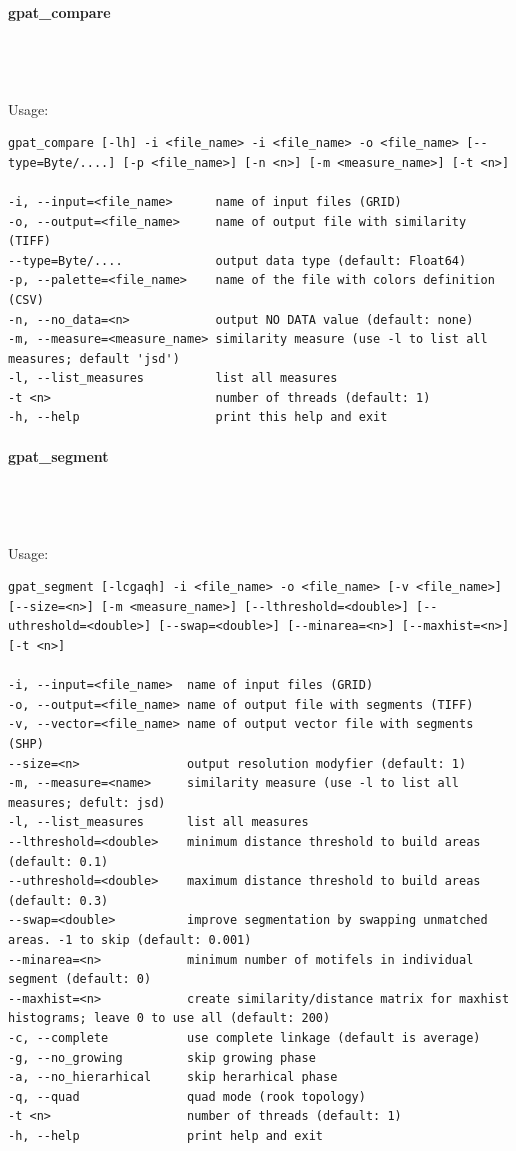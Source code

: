 \documentclass[12pt,margin=0.5in]{article}
\newcommand{\newparagraph}[1]{\paragraph{#1}\mbox{}\\}
\begin{document}
\newparagraph{gpat\_compare}
{}
\\\\
Usage:

\begin{minipage}{\linewidth}
\begin{lstlisting}
gpat_compare [-lh] -i <file_name> -i <file_name> -o <file_name> [--type=Byte/....] [-p <file_name>] [-n <n>] [-m <measure_name>] [-t <n>]

-i, --input=<file_name>      name of input files (GRID)
-o, --output=<file_name>     name of output file with similarity (TIFF)
--type=Byte/....             output data type (default: Float64)
-p, --palette=<file_name>    name of the file with colors definition (CSV)
-n, --no_data=<n>            output NO DATA value (default: none)
-m, --measure=<measure_name> similarity measure (use -l to list all measures; default 'jsd')
-l, --list_measures          list all measures
-t <n>                       number of threads (default: 1)
-h, --help                   print this help and exit
\end{lstlisting}
\end{minipage}

\newparagraph{gpat\_segment}
{}
\\\\
Usage:

\begin{minipage}{\linewidth}
\begin{lstlisting}
gpat_segment [-lcgaqh] -i <file_name> -o <file_name> [-v <file_name>] [--size=<n>] [-m <measure_name>] [--lthreshold=<double>] [--uthreshold=<double>] [--swap=<double>] [--minarea=<n>] [--maxhist=<n>] [-t <n>]

-i, --input=<file_name>  name of input files (GRID)
-o, --output=<file_name> name of output file with segments (TIFF)
-v, --vector=<file_name> name of output vector file with segments (SHP)
--size=<n>               output resolution modyfier (default: 1)
-m, --measure=<name>     similarity measure (use -l to list all measures; defult: jsd)
-l, --list_measures      list all measures
--lthreshold=<double>    minimum distance threshold to build areas (default: 0.1)
--uthreshold=<double>    maximum distance threshold to build areas (default: 0.3)
--swap=<double>          improve segmentation by swapping unmatched areas. -1 to skip (default: 0.001)
--minarea=<n>            minimum number of motifels in individual segment (default: 0)
--maxhist=<n>            create similarity/distance matrix for maxhist histograms; leave 0 to use all (default: 200)
-c, --complete           use complete linkage (default is average)
-g, --no_growing         skip growing phase
-a, --no_hierarhical     skip herarhical phase
-q, --quad               quad mode (rook topology)
-t <n>                   number of threads (default: 1)
-h, --help               print help and exit
\end{lstlisting}
\end{minipage}
\end{document}
